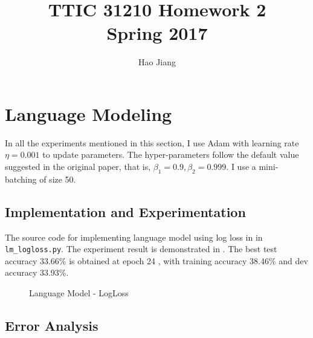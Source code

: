 \documentclass{article}
\title{TTIC 31210 Homework 2 \\ Spring 2017}
\author{Hao Jiang}
\begin{document}
\maketitle
\section{Language Modeling}

In all the experiments mentioned in this section, I use Adam with learning rate $\eta = 0.001$ to update parameters. The hyper-parameters follow the default value suggested in the original paper, that is, $\beta_1=0.9, \beta_2 = 0.999$. I use a mini-batching of size 50.

\subsection{Implementation and Experimentation}
The source code for implementing language model using log loss in in \texttt{lm\_logloss.py}. The experiment result is demonstrated in . The best test accuracy 33.66\% is obtained at epoch 24 , with training accuracy 38.46\% and dev accuracy 33.93\%.

\begin{figure}
\centering
{}
\caption{Language Model - LogLoss}
\label{fig:lm_logloss}
\end{figure}

\subsection{Error Analysis}
\end{document}
